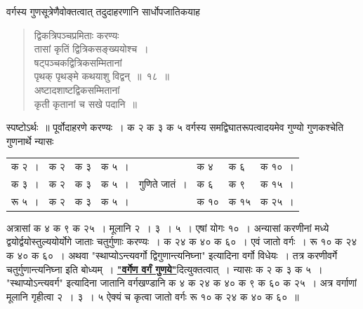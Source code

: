 \documentclass[11pt, openany]{book}
\begin{document}
\vspace{-3mm}
 वर्गस्य गुणसूत्रेणैवोक्तत्वात् तदुदाहरणानि सार्धोपजातिकयाह\textendash  
\begin{quote}
    \ex
     द्विकत्रिपञ्चप्रमिताः करण्यः\\

\vspace{-7mm}
\hspace{1cm} तासां कृतिं द्वित्रिकसङ्ख्ययोश्च~। \\

 \vspace{-7mm}
 षट्पञ्चकद्वित्रिकसम्मितानां \\

\vspace{-7mm}
\hspace{1cm} पृथक् पृथङ्मे कथयाशु विद्वन्~॥~१८~॥\\

 \vspace{-4mm}
 अष्टादशाष्टद्विकसम्मितानां \\

\vspace{-7mm}
\hspace{1cm} कृती कृतानां च सखे पदानि~॥
\end{quote}

 स्पष्टोऽर्थः~॥ पूर्वोदाहरणे करण्यः~। क २ क ३ क ५ 
वर्गस्य समद्विघातरूपत्वादयमेव गुण्यो गुणकश्चेति गुणनार्थे न्यासः 
\vspace{-2mm}

\begin{table}[h!]
    \centering\renewcommand{\arraystretch}{1.1}
    \begin{tabular}{llllclll}
       क २~। &क २ &क ३ &क ५~।&& क ४ &क ६& क १०~। \\
क ३~।& क २& क ३& क ५~।& गुणिते जातं~।& क  ६ &क ९ &क १५~। \\
रू ५~।& क २& क ३& क ५~।&& क १०& क १५ &क २५~।\\ 
    \end{tabular}
\end{table}
\newpage

\noindent अत्रासां क ४ क ९ क २५~। मूलानि २~। ३~। ५~। एषां योगः १०~। अन्यासां करणीनां मध्ये द्वयोर्द्वयोस्तुल्ययोर्योगे जाताः चतुर्गुणाः
करण्यः~। क २४ क ४० क ६०~। एवं जातो वर्गः~। रू १० क २४ क ४० 
क ६०~। अथवा {\qt "स्थाप्योऽन्त्यवर्गो द्विगुणान्त्यनिघ्ना"} इत्यादिना वर्गो
विधेयः~। तत्र करणीवर्गे चतुर्गुणान्त्यनिघ्ना इति बोध्यम्~। \hyperref[12]{\textbf{"वर्गेण वर्गं गुणये"}}दित्युक्तत्वात्~। न्यासः क २ क ३ क ५~। {\qt "स्थाप्योऽन्त्यवर्ग"} इत्यादिना जातानि वर्गखण्डानि क ४ क २४ क ४० क ९ क ६० क २५~। अत्र वर्गाणां मूलानि गृहीत्वा २~। ३~। ५ ऐक्यं च कृत्वा जातो वर्गः रू १० क २४ क ४० क ६०~॥ \\
\end{document}

